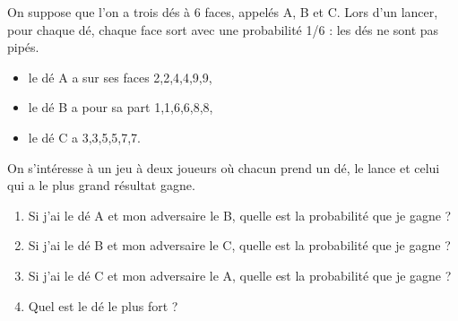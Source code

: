 \documentclass[10pt, a4paper]{article}
\begin{document}



\vspace{3cm}



\begin{tcolorbox}[lefttitle=1cm, colframe=gray!75!black, colback=white, title=\textbf{Exercice 9 : Les dés non transitifs}]
On suppose que l’on a trois dés à 6 faces, appelés A, B et C. Lors d’un lancer, pour chaque dé, chaque
face sort avec une probabilité 1/6 : les dés ne sont pas pipés.
\begin{itemize}
    \item le dé A a sur ses faces 2,2,4,4,9,9,
    \item le dé B a pour sa part 1,1,6,6,8,8,
    \item le dé C a 3,3,5,5,7,7.
\end{itemize}


\begin{tcolorbox}[lefttitle=1cm, colframe=gray!75!black, colback=white, title=\textbf{EXERCICE 9.1}]

On s’intéresse à un jeu à deux joueurs où chacun prend un dé, le lance et celui qui a le plus grand résultat gagne.

\begin{enumerate}
    \item Si j’ai le dé A et mon adversaire le B, quelle est la probabilité que je gagne ?
    \item Si j’ai le dé B et mon adversaire le C, quelle est la probabilité que je gagne ?
    \item Si j’ai le dé C et mon adversaire le A, quelle est la probabilité que je gagne ?
    \item Quel est le dé le plus fort ?
\end{enumerate}

\vspace{6cm}

\end{tcolorbox}

\end{tcolorbox}
\end{document}
